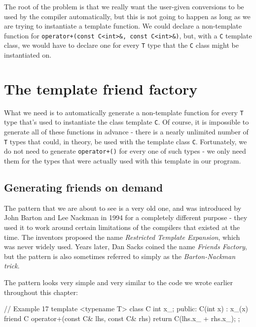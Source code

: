 The root of the problem is that we really want the user-given conversions to be used by the compiler automatically, but this is not going to happen as long as we are trying to instantiate a template function. We could declare a non-template function for \texttt{operator+(const\ C\textless{}int\textgreater{}\&,\ const\ C\textless{}int\textgreater{}\&)}, but, with a \texttt{C} template class, we would have to declare one for every \texttt{T} type that the \texttt{C} class might be instantiated on.

\section{The template friend factory}

What we need is to automatically generate a non-template function for every \texttt{T} type that's used to instantiate the class template \texttt{C}. Of course, it is impossible to generate all of these functions in advance - there is a nearly unlimited number of \texttt{T} types that could, in theory, be used with the template class \texttt{C}. Fortunately, we do not need to generate \texttt{operator+()} for every one of such types - we only need them for the types that were actually used with this template in our program.

\subsection{Generating friends on demand}

The pattern that we are about to see is a very old one, and was introduced by John Barton and Lee Nackman in 1994 for a completely different purpose - they used it to work around certain limitations of the compilers that existed at the time. The inventors proposed the name \emph{Restricted Template Expansion}, which was never widely used. Years later, Dan Sacks coined the name \emph{Friends Factory}, but the pattern is also sometimes referred to simply as the \emph{Barton-Nackman trick}.

The pattern looks very simple and very similar to the code we wrote earlier throughout this chapter:

\begin{code}
// Example 17
template <typename T> class C {
  int x_;
  public:
  C(int x) : x_(x) {}
  friend C operator+(const C& lhs, const C& rhs) {
    return C(lhs.x_ + rhs.x_);
  }
};
\end{code}

